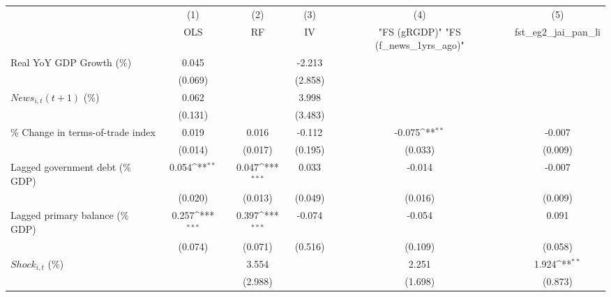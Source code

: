 {
\def\sym#1{\ifmmode^{#1}\else\(^{#1}\)\fi}
\begin{tabular}{l*{5}{c}}
\toprule
                    &\multicolumn{1}{c}{(1)}&\multicolumn{1}{c}{(2)}&\multicolumn{1}{c}{(3)}&\multicolumn{1}{c}{(4)}&\multicolumn{1}{c}{(5)}\\
                    &\multicolumn{1}{c}{OLS}&\multicolumn{1}{c}{RF}&\multicolumn{1}{c}{IV}&\multicolumn{1}{c}{ "FS (gRGDP)"  "FS (f_news_1yrs_ago)" }&\multicolumn{1}{c}{fst_eg2_jai_pan_li}\\
\midrule
Real YoY GDP Growth (\%)&       0.045         &                     &      -2.213         &                     &                     \\
                    &     (0.069)         &                     &     (2.858)         &                     &                     \\
\addlinespace
$ News_{i,t}(t+1)$ (\%)&       0.062         &                     &       3.998         &                     &                     \\
                    &     (0.131)         &                     &     (3.483)         &                     &                     \\
\addlinespace
\% Change in terms-of-trade index&       0.019         &       0.016         &      -0.112         &      -0.075\sym{**} &      -0.007         \\
                    &     (0.014)         &     (0.017)         &     (0.195)         &     (0.033)         &     (0.009)         \\
\addlinespace
Lagged government debt (\% GDP)&       0.054\sym{**} &       0.047\sym{***}&       0.033         &      -0.014         &      -0.007         \\
                    &     (0.020)         &     (0.013)         &     (0.049)         &     (0.016)         &     (0.009)         \\
\addlinespace
Lagged primary balance (\% GDP)&       0.257\sym{***}&       0.397\sym{***}&      -0.074         &      -0.054         &       0.091         \\
                    &     (0.074)         &     (0.071)         &     (0.516)         &     (0.109)         &     (0.058)         \\
\addlinespace
$ Shock_{i,t}$ (\%) &                     &       3.554         &                     &       2.251         &       1.924\sym{**} \\
                    &                     &     (2.988)         &                     &     (1.698)         &     (0.873)         \\

\end{tabular}}
